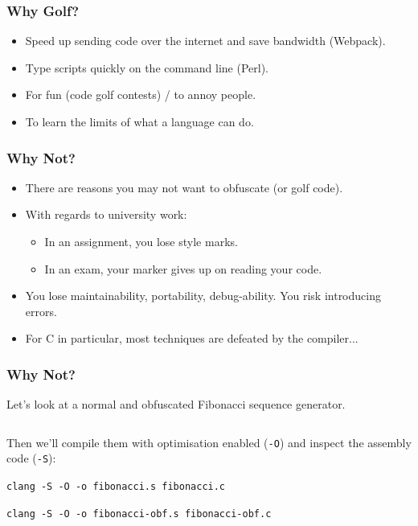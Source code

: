 \documentclass[xcolor]{beamer}
\begin{document}
\begin{frame}
	\frametitle{Why Golf?}
	\pause
	
	\begin{itemize}
		\item Speed up sending code over the internet and save bandwidth (Webpack).
		\pause
		\item Type scripts quickly on the command line (Perl).
		\pause
		\item For fun (code golf contests) / to annoy people.
		\pause
		\item To learn the limits of what a language can do.
	\end{itemize}
\end{frame}

\begin{frame}
	\frametitle{Why Not?}
	\pause
	
	\begin{itemize}
		\item There are reasons you may not want to obfuscate (or golf code).
		\pause
		\item With regards to university work:
		\pause
		\begin{itemize}
			\item In an assignment, you lose style marks.
			\pause
			\item In an exam, your marker gives up on reading your code.
		\end{itemize}
		\pause
		\item You lose maintainability, portability, debug-ability. You risk introducing errors.
		\pause
		\item For C in particular, most techniques are defeated by the compiler...
	\end{itemize}
\end{frame}

\begin{frame}
	\frametitle{Why Not?}
	\pause
	
	Let's look at a normal and obfuscated Fibonacci sequence generator.
	\pause
	
	\begin{columns}
		\begin{column}{0.45\textwidth}
			\centering
			
		\end{column}
		\pause
		\begin{column}{0.45\textwidth}
			\centering
			
		\end{column}
	\end{columns}
	\pause
	
	Then we'll compile them with optimisation enabled (\texttt{-O}) and inspect the assembly code (\texttt{-S}):
	\pause
	
	\texttt{clang -S -O -o fibonacci.s fibonacci.c}
	
	\texttt{clang -S -O -o fibonacci-obf.s fibonacci-obf.c}
\end{frame}
\end{document}

